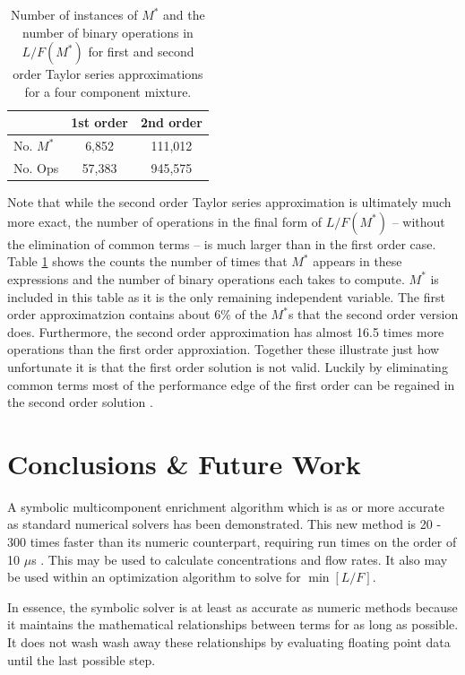 \documentclass{ansconf}
\newcommand{\us}[0]{$\mu$s }
\begin{document}
\begin{table}[htbp]
\begin{center}
\caption{Number of instances of $M^*$ and the number of binary operations in 
         $L/F(M^*)$ for first and second order Taylor series approximations for a 
         four component mixture.}
\begin{tabular}{|l||c|c|}
\hline
& \bf{1st order} & \bf{2nd order} \\
\hline
No. $M^*$ & 6,852  &  111,012 \\ 
\hline
No. Ops   & 57,383 &  945,575 \\ 
\hline
\end{tabular}
\label{count_ops}
\end{center}
\end{table}


Note that while the second order Taylor series approximation is ultimately much more 
exact, the number of operations in the final form of $L/F(M^*)$ -- without the 
elimination of common terms -- is much larger than 
in the first order case.  Table \ref{count_ops} shows the counts the number of times
that $M^*$ appears in these expressions and the number of binary operations each 
takes to compute.  $M^*$ is included in this table as it is the only remaining 
independent variable.  The first order approximatzion contains about 6\% of the
$M^*$s that the second order version does.  Furthermore, the second order 
approximation has almost 16.5 times more operations than the first order 
approxiation.  Together these illustrate just how unfortunate it is that the first
order solution is not valid.  Luckily by eliminating common terms most of the 
performance edge of the first order can be regained in the second order solution
\cite{Scopatz2012}.

\section{Conclusions \& Future Work}
\label{sec:conc}

A symbolic multicomponent enrichment algorithm which is as or more accurate as 
standard numerical solvers has been demonstrated.  This new method is 20 - 300
times faster than its numeric counterpart, requiring run times on the order of 10 \us.
This may be used to calculate concentrations and flow rates.  It also may be used 
within an optimization algorithm to solve for $\min\left[L/F\right]$.

In essence, the symbolic solver is at least as accurate as numeric methods because
it maintains the mathematical relationships between terms for as long as possible.
It does not wash wash away these relationships by evaluating floating point data
until the last possible step.
\end{document}
